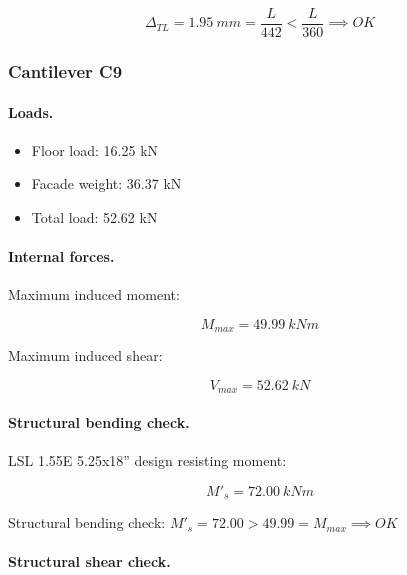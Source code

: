 \begin{equation}
  \Delta_{TL}= 1.95\ mm= \frac{L}{442} < \frac{L}{360} \implies OK
\end{equation}

\subsubsection{Cantilever C9}

\paragraph{Loads.}

\begin{itemize}
\item Floor load: 16.25 kN
\item Facade weight: 36.37 kN
\item Total load: 52.62 kN
\end{itemize}

\paragraph{Internal forces.}

\noindent Maximum induced moment:

\begin{equation}
  M_{max}= 49.99\ kN m
\end{equation}

\noindent Maximum induced shear:

\begin{equation}
  V_{max}= 52.62\ kN
\end{equation}

\paragraph{Structural bending check.}

\noindent LSL 1.55E 5.25x18'' design resisting moment:

\begin{equation}
  M'_s= 72.00\ kN m
\end{equation}

\noindent Structural bending check: $M'_s = 72.00 > 49.99 = M_{max} \implies OK$

\paragraph{Structural shear check.}


